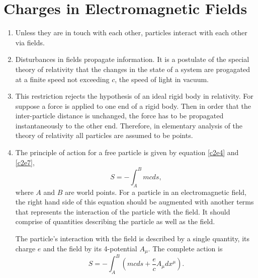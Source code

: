 \chapter{Charges in Electromagnetic Fields}\label{c3}
\begin{enumerate}
\item Unless they are in touch with each other, particles interact with each
other via fields.

\item Disturbances in fields propagate information. It is a postulate of the 
special theory of relativity that the changes in the state of a system are
progagated at a finite speed not exceeding $c$, the speed of light in vacuum.

\item This restriction rejects the hypothesis of an ideal rigid body in relativity.
For suppose a force is applied to one end of a rigid body. Then in order that the
inter-particle distance is unchanged, the force has to be propagated instantaneously
to the other end. Therefore, in elementary analysis of the theory of relativity
all particles are assumed to be points.

\item The principle of action for a free particle is given by equation \eqref{c2e4}
and \eqref{c2e7},
\begin{equation}\label{c3e1}
S = -\int_{A}^{B}mcds,
\end{equation}
where $A$ and $B$ are world points.
For a particle in an electromagnetic field, the right hand side of this equation
should be augmented with another terms that represents the interaction of the
particle with the field. It should comprise of quantities describing the particle
as well as the field.

The particle's interaction with the field is described by a single quantity, its
charge $e$ and the field by its 4-potential $A_\mu$. The complete action is
\begin{equation}\label{c3e2}
S = -\int_A^B \left(mcds + \frac{e}{c}A_\mu dx^\mu\right).
\end{equation}


\end{enumerate}
